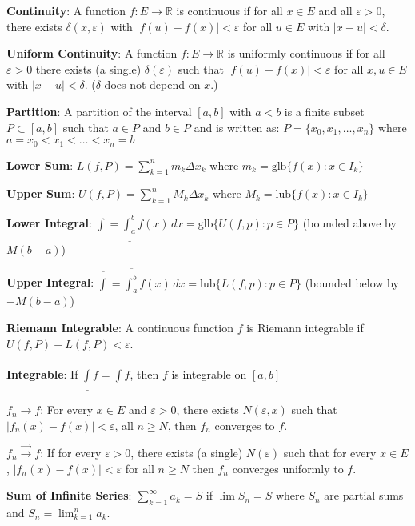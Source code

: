 \documentclass[12pt]{article}
\newcommand{\reals}{\mathbb{R}}
\newcommand{\entry}[1]{\textbf{#1}: } %
\begin{document}
\begin{multicols}{0}
\entry{Continuity}{A function $f: E \to \reals$ is continuous if for all $x \in E$ and all $\varepsilon > 0$, there exists $\delta(x,\varepsilon)$ with $|f(u) - f(x)| < \varepsilon$ for all $u \in E$ with $|x - u| < \delta$.}

\entry{Uniform Continuity}{A function $f: E \to \reals$ is uniformly continuous if for all $\varepsilon > 0$ there exists (a single) $\delta(\varepsilon)$ such that $|f(u) - f(x)| < \varepsilon$ for all $x,u \in E$ with $|x-u| < \delta$. ($\delta$ does not depend on $x$.)}

\entry{Partition}{A partition of the interval $[a,b]$ with $a < b$ is a finite subset $P \subset [a,b]$ such that $a \in P$ and $b \in P$ and is written as: $P = \{x_0, x_1, \dots, x_n\}$ where $a = x_0 < x_1 < \dots < x_n = b$}

\entry{Lower Sum}{$L(f,P) = \sum_{k=1}^n m_k \Delta x_k$ where $m_k = \text{glb}\{f(x): x \in I_k\}$}

\entry{Upper Sum}{$U(f,P) = \sum_{k=1}^n M_k \Delta x_k$ where $M_k = \text{lub}\{f(x): x \in I_k\}$}

\entry{Lower Integral}{$\underline{\int} =  \underline{\int_a^b} f(x) \, dx = \text{glb}\{U(f,p): p \in P \}$ (bounded above by $M(b-a)$)}

\entry{Upper Integral}{$\overline{\int} = \overline{\int_a^b} f(x) \, dx = \text{lub}\{L(f,p): p \in P\}$ (bounded below by $-M(b-a)$)}

\entry{Riemann Integrable}{A continuous function $f$ is Riemann integrable if $U(f,P) - L(f,P) < \varepsilon$.}

\entry{Integrable}{If $\underline\int f = \overline\int f$, then $f$ is integrable on $[a,b]$}

\entry{$f_n \to f$}{For every $x \in E$ and $\varepsilon > 0$, there exists $N(\varepsilon, x)$ such that $|f_n(x) - f(x)| < \varepsilon$, all $n \geq N$, then $f_n$ converges to $f$.}

\entry{$f_n \stackrel{\to}{\to} f$}{If for every $\varepsilon > 0$, there exists (a single) $N(\varepsilon)$ such that for every $x \in E$, $|f_n(x) - f(x)| < \varepsilon$ for all $n \geq N$ then $f_n$ converges uniformly to $f$.}

\entry{Sum of Infinite Series}{$\sum_{k=1}^\infty a_k = S$ if $\lim S_n = S$ where $S_n$ are partial sums and $S_n = \lim_{k=1}^n a_k$.}

\end{multicols}
\end{document}
